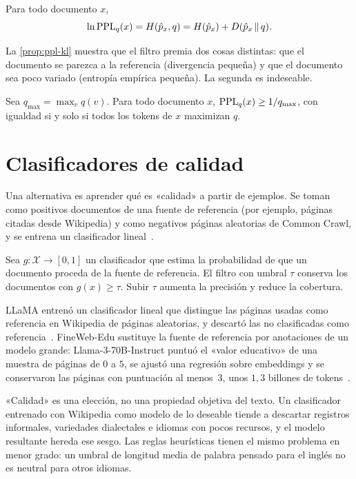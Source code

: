 \begin{proposicion}\label{prop:ppl-kl}
Para todo documento $x$,
\[
\ln\operatorname{PPL}_q(x)=H(\hat p_x,q)=H(\hat p_x)+D(\hat p_x\,\|\,q).
\]
\end{proposicion}

La \cref{prop:ppl-kl} muestra que el filtro premia dos cosas distintas: que el documento se parezca a la referencia (divergencia pequeña) y que el documento sea poco variado (entropía empírica pequeña). La segunda es indeseable.

\begin{corolario}\label{cor:repeticion}
Sea $q_{\max}=\max_v q(v)$. Para todo documento $x$, $\operatorname{PPL}_q(x)\ge 1/q_{\max}$, con igualdad si y solo si todos los tokens de $x$ maximizan $q$.
\end{corolario}

\addtocounter{definicion}{1}%

\section{Clasificadores de calidad}

Una alternativa es aprender qué es «calidad» a partir de ejemplos. Se toman como positivos documentos de una fuente de referencia (por ejemplo, páginas citadas desde Wikipedia) y como negativos páginas aleatorias de Common Crawl, y se entrena un clasificador lineal~\cite[§2.7]{cs336a4}.

\begin{definicion}
Sea $g\colon\mathcal{X}\to[0,1]$ un clasificador que estima la probabilidad de que un documento proceda de la fuente de referencia. El filtro con umbral $\tau$ conserva los documentos con $g(x)\ge\tau$. Subir $\tau$ aumenta la precisión y reduce la cobertura.
\end{definicion}

LLaMA entrenó un clasificador lineal que distingue las páginas usadas como referencia en Wikipedia de páginas aleatorias, y descartó las no clasificadas como referencia~\cite[§2.1]{llama}. FineWeb-Edu sustituye la fuente de referencia por anotaciones de un modelo grande: Llama-3-70B-Instruct puntuó el «valor educativo» de una muestra de páginas de $0$ a $5$, se ajustó una regresión sobre embeddings y se conservaron las páginas con puntuación al menos~$3$, unos $1{,}3$ billones de tokens~\cite[§4]{fineweb}.

\begin{observacion}
«Calidad» es una elección, no una propiedad objetiva del texto. Un clasificador entrenado con Wikipedia como modelo de lo deseable tiende a descartar registros informales, variedades dialectales e idiomas con pocos recursos, y el modelo resultante hereda ese sesgo. Las reglas heurísticas tienen el mismo problema en menor grado: un umbral de longitud media de palabra pensado para el inglés no es neutral para otros idiomas.
\end{observacion}

